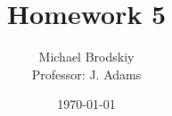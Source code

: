 


\title{Homework 5}
\date{\today}
\author{Michael Brodskiy\\ \small Professor: J. Adams}



\maketitle

